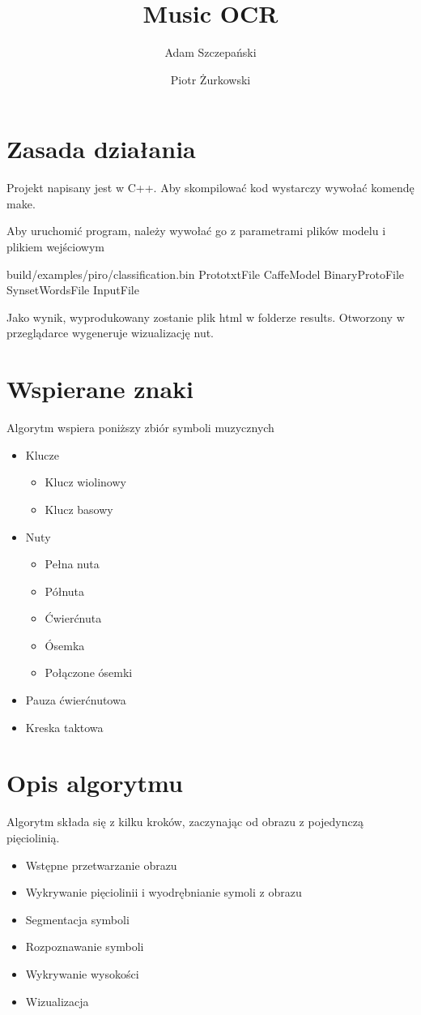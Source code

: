 \documentclass[a4paper,11pt]{article}
\title{Music OCR}
\author{
	Adam Szczepański
	\and
	Piotr Żurkowski
}
\begin{document}
\maketitle

\section{Zasada działania}

Projekt napisany jest w C++. Aby skompilować kod wystarczy wywołać komendę make.

Aby uruchomić program, należy wywołać go z parametrami plików modelu i plikiem wejściowym

build/examples/piro/classification.bin PrototxtFile CaffeModel BinaryProtoFile SynsetWordsFile InputFile

Jako wynik, wyprodukowany zostanie plik html w folderze results. Otworzony w przeglądarce wygeneruje wizualizację nut.

\section{Wspierane znaki}

Algorytm wspiera poniższy zbiór symboli muzycznych
\begin{itemize}
\item Klucze
  \begin{itemize}
  \item Klucz wiolinowy
  \item Klucz basowy
  \end{itemize}
\item Nuty
  \begin{itemize}
  \item Pełna nuta
  \item Półnuta
  \item Ćwierćnuta
  \item Ósemka
  \item Połączone ósemki
  \end{itemize}
\item Pauza ćwierćnutowa
\item Kreska taktowa
\end{itemize}

\section{Opis algorytmu}

Algorytm składa się z kilku kroków, zaczynając od obrazu z pojedynczą pięciolinią.
\begin{itemize}
\item Wstępne przetwarzanie obrazu
\item Wykrywanie pięciolinii i wyodrębnianie symoli z obrazu
\item Segmentacja symboli
\item Rozpoznawanie symboli
\item Wykrywanie wysokości
\item Wizualizacja
\end{itemize}
\end{document}
